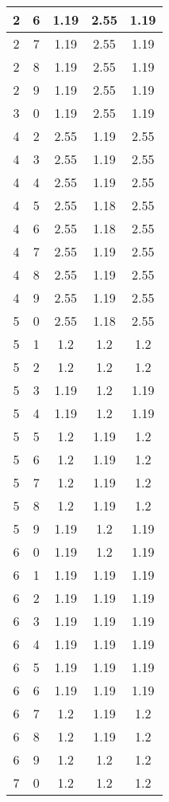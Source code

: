 \begin{longtable}{|c|c||c||c||c|}
	2 & 6 & 1.19 & 2.55 & 1.19 \\ \hline
	2 & 7 & 1.19 & 2.55 & 1.19 \\ \hline
	2 & 8 & 1.19 & 2.55 & 1.19 \\ \hline
	2 & 9 & 1.19 & 2.55 & 1.19 \\ \hline
	3 & 0 & 1.19 & 2.55 & 1.19 \\ \hline
	4 & 2 & 2.55 & 1.19 & 2.55 \\ \hline
	4 & 3 & 2.55 & 1.19 & 2.55 \\ \hline
	4 & 4 & 2.55 & 1.19 & 2.55 \\ \hline
	4 & 5 & 2.55 & 1.18 & 2.55 \\ \hline
	4 & 6 & 2.55 & 1.18 & 2.55 \\ \hline
	4 & 7 & 2.55 & 1.19 & 2.55 \\ \hline
	4 & 8 & 2.55 & 1.19 & 2.55 \\ \hline
	4 & 9 & 2.55 & 1.19 & 2.55 \\ \hline
	5 & 0 & 2.55 & 1.18 & 2.55 \\ \hline
	5 & 1 & 1.2 & 1.2 & 1.2 \\ \hline
	5 & 2 & 1.2 & 1.2 & 1.2 \\ \hline
	5 & 3 & 1.19 & 1.2 & 1.19 \\ \hline
	5 & 4 & 1.19 & 1.2 & 1.19 \\ \hline
	5 & 5 & 1.2 & 1.19 & 1.2 \\ \hline
	5 & 6 & 1.2 & 1.19 & 1.2 \\ \hline
	5 & 7 & 1.2 & 1.19 & 1.2 \\ \hline
	5 & 8 & 1.2 & 1.19 & 1.2 \\ \hline
	5 & 9 & 1.19 & 1.2 & 1.19 \\ \hline
	6 & 0 & 1.19 & 1.2 & 1.19 \\ \hline
	6 & 1 & 1.19 & 1.19 & 1.19 \\ \hline
	6 & 2 & 1.19 & 1.19 & 1.19 \\ \hline
	6 & 3 & 1.19 & 1.19 & 1.19 \\ \hline
	6 & 4 & 1.19 & 1.19 & 1.19 \\ \hline
	6 & 5 & 1.19 & 1.19 & 1.19 \\ \hline
	6 & 6 & 1.19 & 1.19 & 1.19 \\ \hline
	6 & 7 & 1.2 & 1.19 & 1.2 \\ \hline
	6 & 8 & 1.2 & 1.19 & 1.2 \\ \hline
	6 & 9 & 1.2 & 1.2 & 1.2 \\ \hline
	7 & 0 & 1.2 & 1.2 & 1.2 \\ \hline

\end{longtable}

